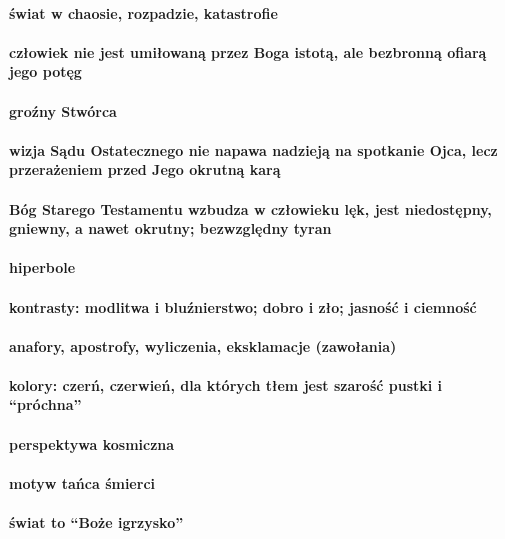 \documentclass{article}
\begin{document}
    \paragraph*{świat w chaosie, rozpadzie, katastrofie}
    \paragraph*{człowiek nie jest umiłowaną przez Boga istotą, ale bezbronną ofiarą jego potęg}
    \paragraph*{groźny Stwórca}
    \paragraph*{wizja Sądu Ostatecznego nie napawa nadzieją na spotkanie Ojca, lecz przerażeniem przed Jego okrutną karą}
    \paragraph*{Bóg Starego Testamentu wzbudza w człowieku lęk, jest niedostępny, gniewny, a nawet okrutny; bezwzględny tyran}
    \paragraph*{hiperbole}
    \paragraph*{kontrasty: modlitwa i bluźnierstwo; dobro i zło; jasność i ciemność}
    \paragraph*{anafory, apostrofy, wyliczenia, eksklamacje (zawołania)}
    \paragraph*{kolory: czerń, czerwień, dla których tłem jest szarość pustki i ``próchna''}
    \paragraph*{perspektywa kosmiczna}
    \paragraph*{motyw tańca śmierci}
    \paragraph*{świat to ``Boże igrzysko''}
\end{document}

